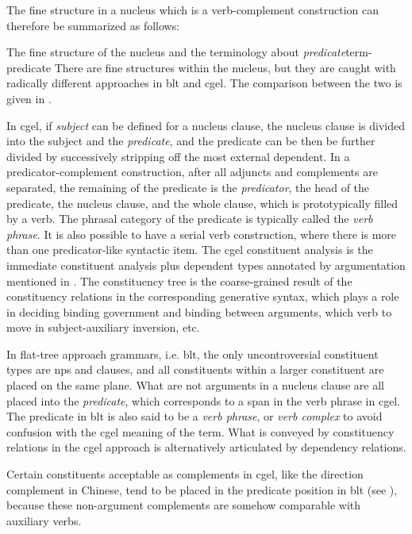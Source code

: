 \documentclass{article}
\newcommand*{\term}[1]{\emph{#1}}
\begin{document}
The fine structure in a nucleus which is a verb-complement construction can therefore be summarized as follows:
\begin{infobox}{The fine structure of the nucleus and the terminology about \term{predicate}}{term-predicate}
    There are fine structures within the nucleus,
    but they are caught with radically different approaches in \ac{blt} and \ac{cgel}.
    The comparison between the two is given in .

    In \ac{cgel}, if \term{subject} can be defined for a nucleus clause,  
    the nucleus clause is divided into the subject and the \term{predicate},
    and the predicate can be then be further divided 
    by successively stripping off the most external dependent.
    In a predicator-complement construction,
    after all adjuncts and complements are separated, 
    the remaining of the predicate is the \term{predicator},
    the head of the predicate, the nucleus clause, and the whole clause,
    which is prototypically filled by a verb.
    The phrasal category of the predicate is typically called the \term{verb phrase}.
    It is also possible to have a serial verb construction,
    where there is more than one predicator-like syntactic item.
    The \ac{cgel} constituent analysis is the immediate constituent analysis 
    plus dependent types annotated by argumentation mentioned in .
    The constituency tree is the coarse-grained result 
    of the constituency relations in the corresponding generative syntax,
    which plays a role in deciding binding government and binding between arguments, 
    which verb to move in subject-auxiliary inversion, etc.

    In flat-tree approach grammars, i.e. \ac{blt}, 
    the only uncontroversial constituent types are \ac{np}s and clauses,
    and all constituents within a larger constituent are placed on the same plane.
    What are not arguments in a nucleus clause 
    are all placed into the \term{predicate},
    which corresponds to a span in the verb phrase in \ac{cgel}. 
    The predicate in \ac{blt} is also said to be a \term{verb phrase},
    or \term{verb complex} to avoid confusion with the \ac{cgel} meaning of the term.
    What is conveyed by constituency relations in the \ac{cgel} approach
    is alternatively articulated by dependency relations.

    Certain constituents acceptable as complements in \ac{cgel}, 
    like the direction complement in Chinese, 
    tend to be placed in the predicate position in \ac{blt} (see ),
    because these non-argument complements are somehow comparable with auxiliary verbs.


\end{infobox}
\end{document}
